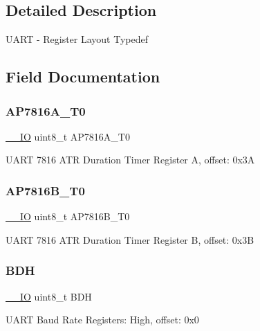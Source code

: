 \subsection{Detailed Description}
U\+A\+RT -\/ Register Layout Typedef 

\subsection{Field Documentation}
\mbox{\label{struct_u_a_r_t___type_aee34a4f9eb528d93f0cc7502501fb907}} 
\subsubsection{\texorpdfstring{AP7816A\_T0}{AP7816A\_T0}}
{\footnotesize\ttfamily \mbox{\hyperlink{core__cm0plus_8h_aec43007d9998a0a0e01faede4133d6be}{\+\_\+\+\_\+\+IO}} uint8\+\_\+t A\+P7816\+A\+\_\+\+T0}

U\+A\+RT 7816 A\+TR Duration Timer Register A, offset\+: 0x3A \mbox{\label{struct_u_a_r_t___type_ae77f8de9862af2873d5d822ef5229f0a}} 
\subsubsection{\texorpdfstring{AP7816B\_T0}{AP7816B\_T0}}
{\footnotesize\ttfamily \mbox{\hyperlink{core__cm0plus_8h_aec43007d9998a0a0e01faede4133d6be}{\+\_\+\+\_\+\+IO}} uint8\+\_\+t A\+P7816\+B\+\_\+\+T0}

U\+A\+RT 7816 A\+TR Duration Timer Register B, offset\+: 0x3B \mbox{\label{struct_u_a_r_t___type_af1f73251625b304407339862ce318059}} 
\subsubsection{\texorpdfstring{BDH}{BDH}}
{\footnotesize\ttfamily \mbox{\hyperlink{core__cm0plus_8h_aec43007d9998a0a0e01faede4133d6be}{\+\_\+\+\_\+\+IO}} uint8\+\_\+t B\+DH}

U\+A\+RT Baud Rate Registers\+: High, offset\+: 0x0 \mbox{\label{struct_u_a_r_t___type_aca4463c928e7f65eaa324dd97fb6abae}} 
